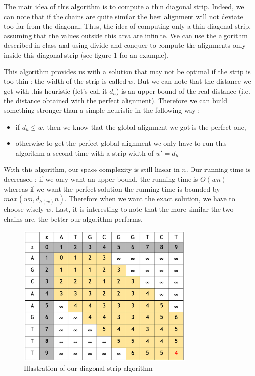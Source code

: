 The main idea of this algorithm is to compute a thin diagonal strip. Indeed, we can note that if the chains are quite similar the best alignment will not deviate too far from the diagonal. Thus, the idea of computing only a thin diagonal strip, assuming that the values outside this area are infinite.
We can use the algorithm described in class and using divide and conquer to compute the alignments only inside this diagonal strip (see figure 1 for an example).


This algorithm provides us with a solution that may not be optimal if the strip is too thin ; the width of the strip is called $w$. But we can note that the distance we get with this heuristic (let's call it $d_{h}$) is an upper-bound of the real distance (i.e. the distance obtained with the perfect alignment). Therefore we can build something stronger than a simple heuristic in the following way :
\begin{itemize}
	\item if $d_{h}\leqslant w$, then we know that the global alignment we got is the perfect one,
	\item otherwise to get the perfect global alignment we only have to run this algorithm a second time with a strip width of $w'=d_{h}$
\end{itemize}

With this algorithm, our space complexity is still linear in $n$. Our running time is decreased : if we only want an upper-bound, the running-time is $O(wn)$ whereas if we want the perfect solution the running time is bounded by $max(wn,d_{h(w)}n)$.
Therefore when we want the exact solution, we have to choose wisely $w$. Last, it is interesting to note that the more similar the two chains are, the better our algorithm performs.
\begin{figure}[H]
	\centering
		\includegraphics[height=7cm]{adn3.png}
	\caption{Illustration of our diagonal strip algorithm}
	\label{fig:adn}
\end{figure}
